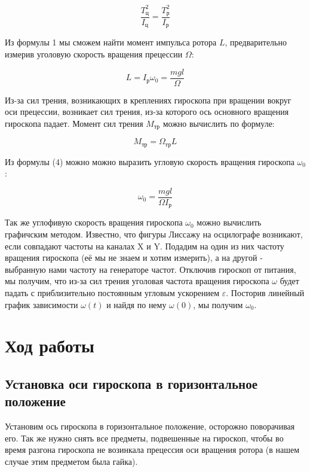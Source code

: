 \documentclass[a4paper]{article}
\begin{document}
\begin{equation}
	\frac{T_\text{ц}^2}{I_\text{ц}} = \frac{T_\text{р}^2}{I_\text{р}}
\end{equation}

Из формулы 1 мы сможем найти момент импульса ротора $L$, предварительно измерив уголовую скорость вращения прецессии $\Omega$:

\begin{equation}
	L = I_\text{р}\omega_0 = \frac{mgl}{\Omega}
\end{equation}

Из-за сил трения, возникающих в креплениях гироскопа при вращении вокруг оси прецессии, возникает сил трения, из-за которого ось основного вращения гироскопа падает. Момент сил трения $M_\text{тр}$ можно вычислить по формуле:

\begin{equation}
	M_\text{тр} = \Omega_\text{тр} L
\end{equation}

Из формулы (4) можно можно выразить угловую скорость вращения гироскопа $\omega_0$:

\begin{equation}
	\omega_0 = \frac{mgl}{\Omega I_\text{р}}
\end{equation}

Так же углофивую скорость вращения гироскопа $\omega_0$ можно вычислить графичским методом. Известно, что фигуры Лиссажу на осцилографе возникают, если совпадают частоты на каналах X и Y. Подадим на один из них частоту вращения гироскопа (её мы не знаем и хотим измерить), а на другой - выбранную нами частоту на генераторе частот. Отключив гироскоп от питания, мы получим, что из-за сил трения уголовая частота вращения гироскопа $\omega$ будет падать с приблизительно постоянным угловым ускорением $\varepsilon$. Посторив линейный график зависимости $\omega(t)$ и найдя по нему $\omega(0)$, мы получим $\omega_0$.

\section{Ход работы}

\subsection{Установка оси гироскопа в горизонтальное положение}

Установим ось гироскопа в горизонтальное положение, осторожно поворачивая его. Так же нужно снять все предметы, подвешенные на гироскоп, чтобы во время разгона гироскопа не возинкала прецессия оси вращения ротора (в нашем случае этим предметом была гайка).
\end{document}
